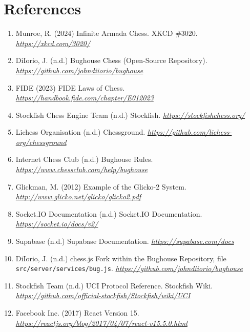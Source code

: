 \documentclass[11pt,a4paper]{article}
\begin{document}
\section*{References}
\begin{enumerate}[leftmargin=*]

\item Munroe, R. (2024) Infinite Armada Chess. XKCD \#3020.  \textit{\url{https://xkcd.com/3020/}} 

\item DiIorio, J. (n.d.) Bughouse Chess (Open-Source Repository). \textit{\url{https://github.com/johndiiorio/bughouse}} 

\item FIDE (2023) FIDE Laws of Chess. \textit{\url{https://handbook.fide.com/chapter/E012023}} 

\item Stockfish Chess Engine Team (n.d.) Stockfish. \textit{\url{https://stockfishchess.org/}} 

\item Lichess Organisation (n.d.) Chessground. \textit{\url{https://github.com/lichess-org/chessground}} 

\item Internet Chess Club (n.d.) Bughouse Rules. \textit{\url{https://www.chessclub.com/help/bughouse}} 

\item Glickman, M. (2012) Example of the Glicko-2 System. \textit{\url{http://www.glicko.net/glicko/glicko2.pdf}} 

\item Socket.IO Documentation (n.d.) Socket.IO Documentation. \textit{\url{https://socket.io/docs/v2/}} 

\item Supabase (n.d.) Supabase Documentation. \textit{\url{https://supabase.com/docs}} 

\item DiIorio, J. (n.d.) chess.js Fork within the Bughouse Repository, file \texttt{src/server/services/bug.js}. \textit{\url{https://github.com/johndiiorio/bughouse}} 

\item Stockfish Team (n.d.) UCI Protocol Reference. Stockfish Wiki. \textit{\url{https://github.com/official-stockfish/Stockfish/wiki/UCI}} 

\item Facebook Inc. (2017) React Version 15. \textit{\url{https://reactjs.org/blog/2017/04/07/react-v15.5.0.html}} 


\end{enumerate}
\end{document}
